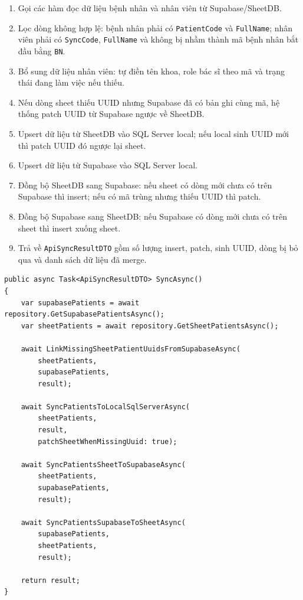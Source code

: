 \documentclass[12pt,a4paper]{article}
\numberwithin{figure}{subsection}
\numberwithin{table}{subsection}
\newcounter{codecounter}
\newenvironment{codeblock}[2]{%
    \refstepcounter{codecounter}%
    \phantomsection%
    \label{#1}%
    \par\smallskip
}{%
    \par\smallskip
}
\begin{document}
\begin{enumerate}
    \item Gọi các hàm đọc dữ liệu bệnh nhân và nhân viên từ Supabase/SheetDB.
    \item Lọc dòng không hợp lệ: bệnh nhân phải có \texttt{PatientCode} và \texttt{FullName}; nhân viên phải có \texttt{SyncCode}, \texttt{FullName} và không bị nhầm thành mã bệnh nhân bắt đầu bằng \texttt{BN}.
    \item Bổ sung dữ liệu nhân viên: tự điền tên khoa, role bác sĩ theo mã và trạng thái đang làm việc nếu thiếu.
    \item Nếu dòng sheet thiếu UUID nhưng Supabase đã có bản ghi cùng mã, hệ thống patch UUID từ Supabase ngược về SheetDB.
    \item Upsert dữ liệu từ SheetDB vào SQL Server local; nếu local sinh UUID mới thì patch UUID đó ngược lại sheet.
    \item Upsert dữ liệu từ Supabase vào SQL Server local.
    \item Đồng bộ SheetDB sang Supabase: nếu sheet có dòng mới chưa có trên Supabase thì insert; nếu có mã trùng nhưng thiếu UUID thì patch.
    \item Đồng bộ Supabase sang SheetDB: nếu Supabase có dòng mới chưa có trên sheet thì insert xuống sheet.
    \item Trả về \texttt{ApiSyncResultDTO} gồm số lượng insert, patch, sinh UUID, dòng bị bỏ qua và danh sách dữ liệu đã merge.
\end{enumerate}

\begin{codeblock}{code:api-sync-real-flow}{Luồng tổng quát trong ApiSyncBUS}
\begin{verbatim}
public async Task<ApiSyncResultDTO> SyncAsync()
{
    var supabasePatients = await repository.GetSupabasePatientsAsync();
    var sheetPatients = await repository.GetSheetPatientsAsync();

    await LinkMissingSheetPatientUuidsFromSupabaseAsync(
        sheetPatients,
        supabasePatients,
        result);

    await SyncPatientsToLocalSqlServerAsync(
        sheetPatients,
        result,
        patchSheetWhenMissingUuid: true);

    await SyncPatientsSheetToSupabaseAsync(
        sheetPatients,
        supabasePatients,
        result);

    await SyncPatientsSupabaseToSheetAsync(
        supabasePatients,
        sheetPatients,
        result);

    return result;
}
\end{verbatim}
\end{codeblock}
\end{document}
